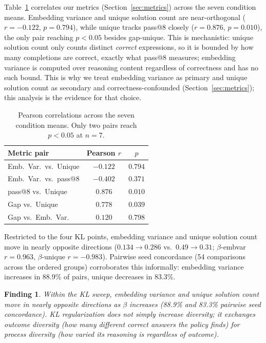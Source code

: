 \documentclass{article}
\newtheorem{finding}{Finding}
\begin{document}
Table~\ref{tab:metric_corr} correlates our metrics (Section~\ref{sec:metrics}) across the seven condition means. Embedding variance and unique solution count are near-orthogonal ($r=-0.122$, $p=0.794$), while unique tracks pass@8 closely ($r=0.876$, $p=0.010$), the only pair reaching $p<0.05$ besides gap-unique. This is mechanistic: unique solution count only counts distinct \emph{correct} expressions, so it is bounded by how many completions are correct, exactly what pass@8 measures; embedding variance is computed over reasoning content regardless of correctness and has no such bound. This is why we treat embedding variance as primary and unique solution count as secondary and correctness-confounded (Section~\ref{sec:metrics}); this analysis is the evidence for that choice.

\begin{table}[h]
\centering
\caption{Pearson correlations across the seven condition means. Only two pairs reach $p<0.05$ at $n=7$.}
\label{tab:metric_corr}
\small
\begin{tabular}{lcc}
\toprule
\textbf{Metric pair} & \textbf{Pearson $r$} & \textbf{$p$} \\
\midrule
Emb.\ Var.\ vs.\ Unique & $-0.122$ & $0.794$ \\
Emb.\ Var.\ vs.\ pass@8 & $-0.402$ & $0.371$ \\
pass@8 vs.\ Unique & $0.876$ & $0.010$ \\
Gap vs.\ Unique & $0.778$ & $0.039$ \\
Gap vs.\ Emb.\ Var.\ & $0.120$ & $0.798$ \\
\bottomrule
\end{tabular}
\end{table}

Restricted to the four KL points, embedding variance and unique solution count move in nearly opposite directions ($0.134{\to}0.286$ vs.\ $0.49{\to}0.31$; $\beta$-embvar $r=0.963$, $\beta$-unique $r=-0.983$). Pairwise seed concordance (54 comparisons across the ordered groups) corroborates this informally: embedding variance increases in 88.9\% of pairs, unique decreases in 83.3\%.

\begin{finding}
\label{find:kltradeoff}
Within the KL sweep, embedding variance and unique solution count move in nearly opposite directions as $\beta$ increases (88.9\% and 83.3\% pairwise seed concordance). KL regularization does not simply increase diversity; it exchanges outcome diversity (how many different correct answers the policy finds) for process diversity (how varied its reasoning is regardless of outcome).
\end{finding}
\end{document}
